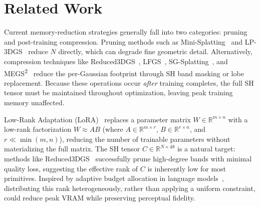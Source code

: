 \documentclass[sigconf]{acmart}
\begin{document}

\section{Related Work}
\label{sec:related}

Current memory-reduction strategies generally fall into two categories: 
pruning and post-training compression. Pruning methods such as 
Mini-Splatting~\cite{minisplatting} and LP-3DGS~\cite{lp3dgs} reduce $N$ 
directly, which can degrade fine geometric detail. Alternatively, compression 
techniques like Reduced3DGS~\cite{Papantonakis_2024}, LFGS~\cite{lfgs}, 
SG-Splatting~\cite{sgsplatting}, and MEGS\textsuperscript{2}~\cite{megs2} reduce the per-Gaussian 
footprint through SH band masking or lobe replacement. Because these operations 
occur \emph{after} training completes, the full SH tensor must be maintained 
throughout optimization, leaving peak training memory unaffected.

Low-Rank Adaptation (LoRA)~\cite{lora} replaces a parameter matrix 
$W \in \mathbb{R}^{m \times n}$ with a low-rank factorization $W \approx AB$ 
(where $A \in \mathbb{R}^{m \times r}$, $B \in \mathbb{R}^{r \times n}$, and 
$r \ll \min(m, n)$), reducing the number of trainable parameters without 
materializing the full matrix. The SH tensor $C \in \mathbb{R}^{N \times 48}$
is a natural target: methods like Reduced3DGS~\cite{Papantonakis_2024} 
successfully prune high-degree bands with minimal quality loss, suggesting the 
effective rank of $C$ is inherently low for most primitives. Inspired by 
adaptive budget allocation in language models~\cite{adalora}, distributing 
this rank heterogeneously, rather than applying a uniform constraint, 
could reduce peak VRAM while preserving perceptual fidelity.


\end{document}
